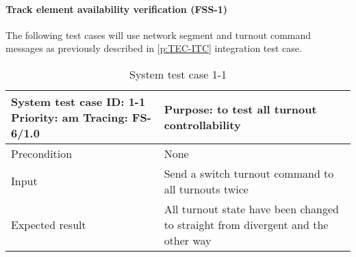 \paragraph{Track element availability verification (FSS-1)} The following test cases will use network segment and turnout command messages as previously described in \autoref{p:TEC-ITC} integration test case. 
\begin{table}[H]
	\caption{System test case 1-1}
	\label{table:TCase-FSS1-01}
	\begin{center}
		\renewcommand{\arraystretch}{1.8}
		\begin{tabu} 
			to 0.9 \textwidth
			{  X[0.4, c] X[c] }
			\toprule
			System test case ID: 1-1 \newline Priority: am \newline Tracing: FS-6/1.0 & Purpose: to test all turnout controllability                                    \\ \midrule
			Precondition                                                              & None                                                                            \\
			Input                                                                     & Send a switch turnout command to all turnouts twice                                \\
			Expected result                                                           & All turnout state have been changed to straight from divergent and the other way \\ \bottomrule
		\end{tabu}
	\end{center}
\end{table}



